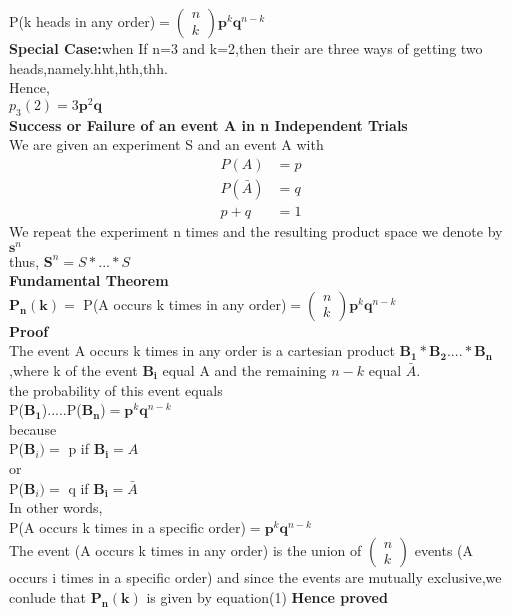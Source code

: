 \documentclass[journal,12pt,twocolumn]{IEEEtran}
\theoremstyle{remark}
\newcommand{\myvec}[1]{\ensuremath{\begin{pmatrix}#1\end{pmatrix}}}
\let\vec\mathbf
\begin{document}
P(k heads in any order)$ = \myvec{n \\k }\vec{p}^k\vec{q}^{n-k}$\\
\textbf{Special Case:}when If n=3 and k=2,then their are three ways of getting two heads,namely.hht,hth,thh.\\
Hence,\\$ p_{3}(2)=3\vec{p}^2\vec{q}$\\
\textbf{Success or Failure of an event A in n Independent Trials}\\
We are given an experiment S and an event A with\\
\begin{align}
P(A)&=p  \\    P(\bar{A})&=q  \\   p+q&=1
\end{align}
We repeat the experiment n times and the resulting product space we denote by $\vec{s}^n$\\
thus, $\vec{S}^n=S*...*S$\\
\textbf{Fundamental Theorem}\\
$\vec{P_{n}(k)}=$ P(A occurs k times in any order)$=\myvec{n \\k }\vec{p}^k\vec{q}^{n-k}$\\
\textbf{Proof}\\
The event {A occurs k times in any order} is a cartesian product $\vec{B_{1}}*\vec{B_{2}}....*\vec{B_{n}}$,where k of the event $\vec{B_{i}}$ equal A and the remaining $n-k$ equal $\bar{A}$.
\\the probability of this event equals\\
P($\vec{B_{1}}$).....P($\vec{B_{n}}$)$=\vec{p}^k\vec{q}^{n-k}$\\
because\\
P($\vec{B}_{i})=$ p if $\vec{B_{i}}=A$\\
or\\
P($\vec{B}_{i})=$ q if $\vec{B_{i}}=\bar{A}$\\
In other words,\\
P(A occurs k times in a specific order)$=\vec{p}^k\vec{q}^{n-k}$\\
The event (A occurs k times in any order) is the union of $\myvec{n\\k}$ events (A occurs i times in a specific order) and since the events are mutually exclusive,we conlude that $\vec{P_{n}(k)} $ is given by equation(1)
\textbf{Hence proved}
\end{document}
